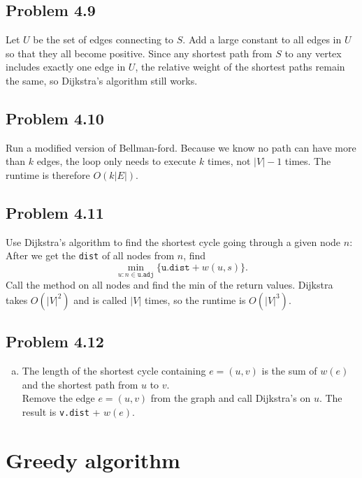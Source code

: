 \documentclass[12pt]{report}
\newcommand{\co}{\texttt}
\begin{document}
\section{Problem 4.9}
Let $U$ be the set of edges connecting to $S$. Add a large constant to all edges in $U$ so that they all become positive. Since any shortest path from $S$ to any vertex includes exactly one edge in $U$, the relative weight of the shortest paths remain the same, so Dijkstra's algorithm still works.

\section{Problem 4.10}
Run a modified version of Bellman-ford. Because we know no path can have more than $k$ edges, the loop only needs to execute $k$ times, not $|V| - 1$ times. The runtime is therefore $O(k |E|)$.

\section{Problem 4.11}
Use Dijkstra's algorithm to find the shortest cycle going through a given node $n$: After we get the \co{dist} of all nodes from $n$, find $$\min_{u : n \in \co{u.adj}} \{ \co{u.dist} + w(u,s)\}.$$
Call the method on all nodes and find the min of the return values. Dijkstra takes $O(|V|^2)$ and is called $|V|$ times, so the runtime is $O(|V|^3)$.

\section{Problem 4.12}
\begin{enumerate}[(a)]
\item The length of the shortest cycle containing $e = (u,v)$ is the sum of $w(e)$ and the shortest path from $u$ to $v$. \\
Remove the edge $e = (u,v)$ from the graph and call Dijkstra's on $u$. The result is \co{v.dist} + $w(e)$.
\end{enumerate}

\chapter[Chapter 5 Solution]{Greedy algorithm}
\end{document}
